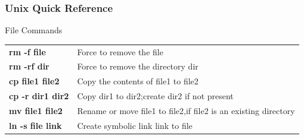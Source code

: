 \documentclass[10pt, hyperref={unicode=true,pdfusetitle, bookmarks=true,bookmarksnumbered=false,bookmarksopen=false, breaklinks=false,pdfborder={0 0l 1},backref=true,colorlinks=true,linkcolor=darkblue,pageanchor}]{beamer}
\begin{document}
\begin{frame}
\frametitle{Unix Quick Reference}
\begin{block}{File Commands}

\begin{tabular}{ll}
\textbf{rm -f file}      & Force to remove the file                                              \tabularnewline
\textbf{rm -rf dir}      & Force to remove the directory dir                                     \tabularnewline
\textbf{cp file1 file2}  & Copy the contents of file1 to file2                                   \tabularnewline
\textbf{cp -r dir1 dir2} & Copy dir1 to dir2;create dir2 if not present                          \tabularnewline
\textbf{mv file1 file2}  & Rename or move file1 to file2,if file2 is an existing directory       \tabularnewline
\textbf{ln -s file link} & Create symbolic link link to file                                     \tabularnewline
\end{tabular}

\end{block}
\end{frame}
\end{document}
